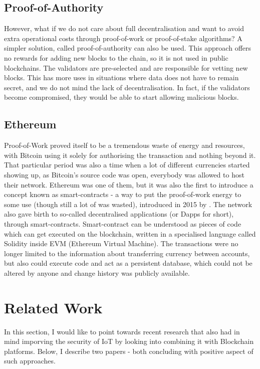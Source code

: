 \subsection{Proof-of-Authority}
However, what if we do not care about full decentralisation and want to avoid extra operational costs through proof-of-work or proof-of-stake algorithms? A simpler solution, called proof-of-authority \cite{network2017proof} can also be used. This approach offers no rewards for adding new blocks to the chain, so it is not used in public blockchains. The validators are pre-selected and are responsible for vetting new blocks. This has more uses in situations where data does not have to remain secret, and we do not mind the lack of decentralisation. In fact, if the validators become compromised, they would be able to start allowing malicious blocks.
\subsection{Ethereum}
Proof-of-Work proved itself to be a tremendous waste of energy and resources, with Bitcoin using it solely for authorising the transaction and nothing beyond it. That particular period was also a time when a lot of different currencies started showing up, as Bitcoin's source code was open, everybody was allowed to host their network. Ethereum was one of them, but it was also the first to introduce a concept known as smart-contracts - a way to put the proof-of-work energy to some use (though still a lot of was wasted), introduced in 2015 by \citet{buterin2014ethereum}. The network also gave birth to so-called decentralised applications (or Dapps for short), through smart-contracts. Smart-contract can be understood as pieces of code which can get executed on the blockchain, written in a specialised language called Solidity inside EVM (Ethereum Virtual Machine). The transactions were no longer limited to the information about transferring currency between accounts, but also could execute code and act as a persistent database, which could not be altered by anyone and change history was publicly available.


\section{Related Work}
In this section, I would like to point towards recent research that also had in mind imporving the security of IoT by looking into combining it with Blockchain platforms. Below, I describe two papers - both concluding with positive aspect of such approaches.

